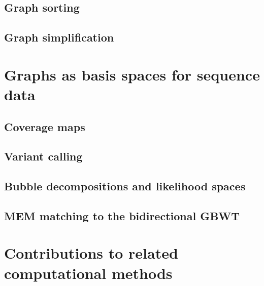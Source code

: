 \subsection{Graph sorting}

\subsection{Graph simplification}


\section{Graphs as basis spaces for sequence data}

\subsection{Coverage maps}

\subsection{Variant calling}

\subsection{Bubble decompositions and likelihood spaces}

\subsection{MEM matching to the bidirectional GBWT}


\section{Contributions to related computational methods}


